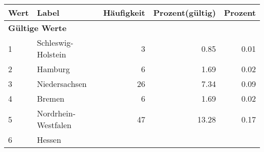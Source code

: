      \begin{longtable}{lXrrr}
     \toprule
     \textbf{Wert} & \textbf{Label} & \textbf{Häufigkeit} & \textbf{Prozent(gültig)} & \textbf{Prozent} \\
     \endhead
     \midrule
     \multicolumn{5}{l}{\textbf{Gültige Werte}}\\

     1 &
     \multicolumn{1}{X}{ Schleswig-Holstein   } &


       \num{3} &
       \num[round-mode=places,round-precision=2]{0,85} &
         \num[round-mode=places,round-precision=2]{0,01} \\

     2 &
     \multicolumn{1}{X}{ Hamburg   } &


       \num{6} &
       \num[round-mode=places,round-precision=2]{1,69} &
         \num[round-mode=places,round-precision=2]{0,02} \\

     3 &
     \multicolumn{1}{X}{ Niedersachsen   } &


       \num{26} &
       \num[round-mode=places,round-precision=2]{7,34} &
         \num[round-mode=places,round-precision=2]{0,09} \\

     4 &
     \multicolumn{1}{X}{ Bremen   } &


       \num{6} &
       \num[round-mode=places,round-precision=2]{1,69} &
         \num[round-mode=places,round-precision=2]{0,02} \\

     5 &
     \multicolumn{1}{X}{ Nordrhein-Westfalen   } &


       \num{47} &
       \num[round-mode=places,round-precision=2]{13,28} &
         \num[round-mode=places,round-precision=2]{0,17} \\

     6 &
     \multicolumn{1}{X}{ Hessen   } &



\end{longtable}
